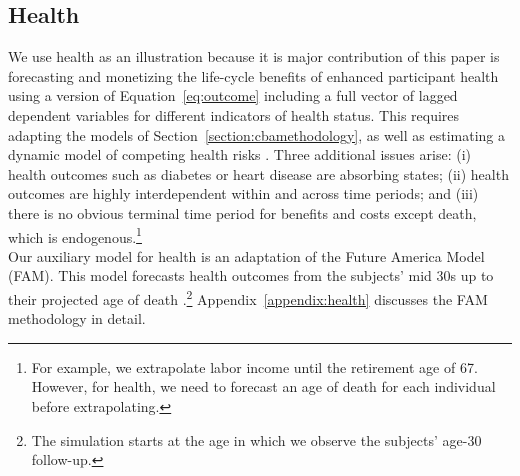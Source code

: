 \subsection{Health}

\noindent We use health as an illustration because it is major contribution of this paper is forecasting and monetizing the life-cycle benefits of enhanced participant health using a version of Equation~\eqref{eq:outcome} including a full vector of lagged dependent variables for different indicators of health status. This requires adapting the models of Section~\ref{section:cbamethodology}, as well as estimating a dynamic model of competing health risks \citep{Kalbfleisch_Prentice_1980_failure}. Three additional issues arise: (i) health outcomes such as diabetes or heart disease are absorbing states; (ii) health outcomes are highly interdependent within and across time periods; and (iii) there is no obvious terminal time period for benefits and costs except death, which is endogenous.\footnote{For example, we extrapolate labor income until the retirement age of 67. However, for health, we need to forecast an age of death for each individual before extrapolating.}\\

\noindent Our auxiliary model for health is an adaptation of the Future America Model (FAM). This model forecasts health outcomes from the subjects' mid 30s up to their projected age of death \citep{Goldman_etal_2015_Future-Elderly-Model-Report}.\footnote{The simulation starts at the age in which we observe the subjects' age-30 follow-up.}  Appendix~\ref{appendix:health} discusses the FAM methodology in detail.\\


